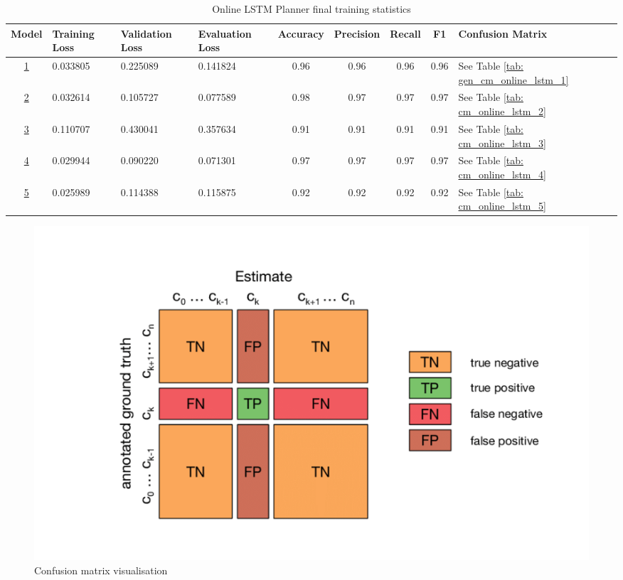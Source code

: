 \begin{table}[h!]
    \footnotesize
    \centerfloat
    \begin{tabular}{|c|M{1.5cm}|M{1.5cm}|M{1.5cm}|c|c|c|c|M{1.5cm}|}
         \hline
         \textbf{Model} & \textbf{Training Loss} & \textbf{Validation Loss} & \textbf{Evaluation Loss} & \textbf{Accuracy} & \textbf{Precision} & \textbf{Recall} & \textbf{F1} & \textbf{Confusion Matrix} \\
         \hline
          \hyperref[tab: evalalgorithms]{1} & 0.033805 & 0.225089 & 0.141824 & 0.96 & 0.96 & 0.96 & 0.96 & See Table \ref{tab: gen_cm_online_lstm_1} \\
         \hline
          \hyperref[tab: evalalgorithms]{2} & 0.032614 & 0.105727 & 0.077589 & 0.98 & 0.97 & 0.97 & 0.97 & See Table \ref{tab: cm_online_lstm_2} \\
         \hline
          \hyperref[tab: evalalgorithms]{3} & 0.110707 & 0.430041 & 0.357634 & 0.91 & 0.91 & 0.91 & 0.91 & See Table \ref{tab: cm_online_lstm_3} \\
         \hline
          \hyperref[tab: evalalgorithms]{4} & 0.029944 & 0.090220 & 0.071301 & 0.97 & 0.97 & 0.97 & 0.97 & See Table \ref{tab: cm_online_lstm_4} \\
         \hline
          \hyperref[tab: evalalgorithms]{5} & 0.025989 & 0.114388 & 0.115875 & 0.92 & 0.92 & 0.92 & 0.92 & See Table \ref{tab: cm_online_lstm_5} \\
         \hline
    \end{tabular}
    \caption{Online LSTM Planner final training statistics}
    \label{tab: gen_online_lstm_final_tr_res}
\end{table}

\pagebreak

\begin{figure}[h!]
    \centering
    \includegraphics[scale=0.30]{images/confusion_matrix.png}
    \caption{Confusion matrix visualisation \cite{conf_mat}}
    \label{fig: confusion_matrix}
\end{figure}


